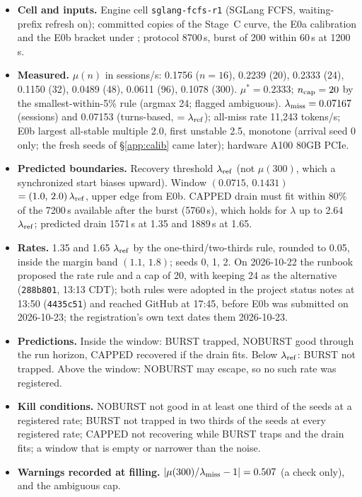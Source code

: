 \begin{itemize}
\item \textbf{Cell and inputs.} Engine cell \texttt{sglang-fcfs-r1} (SGLang FCFS, waiting-prefix refresh on); committed copies of the Stage~C curve, the E0a calibration and the E0b bracket under ; protocol 8700\,s, burst of 200 within 60\,s at 1200\,s.
\item \textbf{Measured.} $\mu(n)$ in sessions/s: 0.1756 ($n=16$), 0.2239 (20), 0.2333 (24), 0.1150 (32), 0.0489 (48), 0.0611 (96), 0.1078 (300). $\mu^*=0.2333$; $n_{\mathrm{cap}}=20$ by the smallest-within-5\% rule (argmax 24; flagged ambiguous). $\lambda_{\mathrm{miss}}=0.07167$ (sessions) and 0.07153 (turns-based, $=\lambda_{\mathrm{ref}}$); all-miss rate 11,243 tokens/s; E0b largest all-stable multiple 2.0, first unstable 2.5, monotone (arrival seed 0 only; the fresh seeds of \S\ref{app:calib} came later); hardware A100 80GB PCIe.
\item \textbf{Predicted boundaries.} Recovery threshold $\lambda_{\mathrm{ref}}$ (not $\mu(300)$, which a synchronized start biases upward). Window $(0.0715,\,0.1431)$\sps{} $=(1.0,\,2.0)\,\lambda_{\mathrm{ref}}$, upper edge from E0b. CAPPED drain must fit within 80\% of the 7200\,s available after the burst (5760\,s), which holds for $\lambda$ up to 2.64 $\lambda_{\mathrm{ref}}$; predicted drain 1571\,s at 1.35 and 1889\,s at 1.65.
\item \textbf{Rates.} 1.35 and 1.65 $\lambda_{\mathrm{ref}}$ by the one-third/two-thirds rule, rounded to 0.05, inside the margin band $(1.1,\,1.8)$; seeds 0, 1, 2. On 2026-10-22 the runbook proposed the rate rule and a cap of 20, with keeping 24 as the alternative (\texttt{288b801}, 13:13 CDT); both rules were adopted in the project status notes at 13:50 (\texttt{4435c51}) and reached GitHub at 17:45, before E0b was submitted on 2026-10-23; the registration's own text dates them 2026-10-23.
\item \textbf{Predictions.} Inside the window: BURST trapped, NOBURST good through the run horizon, CAPPED recovered if the drain fits. Below $\lambda_{\mathrm{ref}}$: BURST not trapped. Above the window: NOBURST may escape, so no such rate was registered.
\item \textbf{Kill conditions.} NOBURST not good in at least one third of the seeds at a registered rate; BURST not trapped in two thirds of the seeds at every registered rate; CAPPED not recovering while BURST traps and the drain fits; a window that is empty or narrower than the noise.
\item \textbf{Warnings recorded at filling.} $|\mu(300)/\lambda_{\mathrm{miss}}-1|=0.507$ (a check only), and the ambiguous cap.
\end{itemize}

